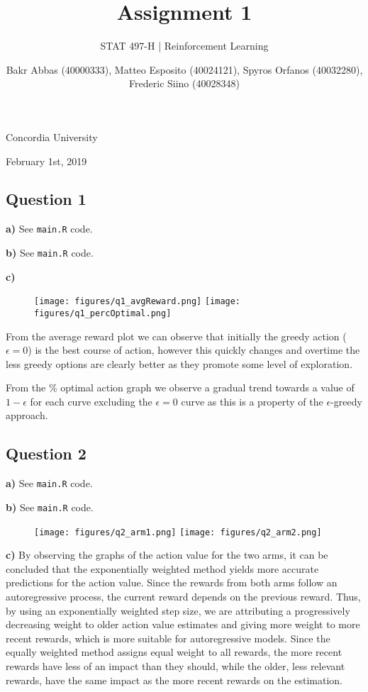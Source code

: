 \documentclass[a4paper,12pt]{article}
\title{\textbf{Assignment 1}}
\author{STAT 497-H | Reinforcement Learning}
\date{Bakr Abbas (40000333), Matteo Esposito (40024121), Spyros Orfanos (40032280), Frederic Siino (40028348)}
\def\code#1{\texttt{#1}}
\begin{document}
\begin{titlingpage}
  \maketitle
  \centering
  \vfill
  {\large{Concordia University}}\par
  {\large{February 1st, 2019}}
\end{titlingpage}

\newpage

\subsection*{Question 1}

\textbf{a)} See \code{main.R} code.

\textbf{b)} See \code{main.R} code.

\textbf{c)}

\begin{figure}[H]
  \centering
  \texttt{[image: figures/q1\_avgReward.png]}
  \qquad
  \texttt{[image: figures/q1\_percOptimal.png]}
\end{figure}

From the average reward plot we can observe that initially the greedy action
($\epsilon = 0$) is the best course of action, however this quickly changes
and overtime the less greedy options are clearly better as they promote some 
level of exploration.
\par
From the \% optimal action graph we observe a gradual trend towards a value of 
$1 - \epsilon$ for each curve excluding the $\epsilon = 0$ curve as this is a 
property of the $\epsilon$-greedy approach.

\subsection*{Question 2}

\textbf{a)} See \code{main.R} code.

\textbf{b)} See \code{main.R} code.

\begin{figure}[H]
  \centering
  \texttt{[image: figures/q2\_arm1.png]}
  \qquad
  \texttt{[image: figures/q2\_arm2.png]}
\end{figure}

\textbf{c)}
By observing the graphs of the action value for the two arms, it can be concluded that the 
exponentially weighted method yields more accurate predictions for the action value. Since 
the rewards from both arms follow an autoregressive process, the current reward depends on 
the previous reward. Thus, by using an exponentially weighted step size, we are attributing a 
progressively decreasing weight to older action value estimates and giving more weight to more 
recent rewards, which is more suitable for autoregressive models. Since the equally weighted 
method assigns equal weight to all rewards, the more recent rewards have less of an impact 
than they should, while the older, less relevant rewards, have the same impact as the more
 recent rewards on the estimation.
\end{document}
